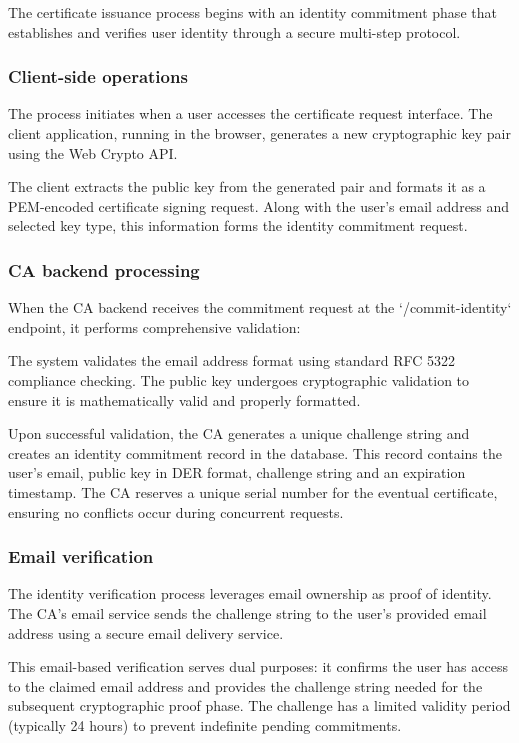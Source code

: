 The certificate issuance process begins with an identity commitment phase that 
establishes and verifies user identity through a secure multi-step protocol.

\subsubsection{Client-side operations}

The process initiates when a user accesses the certificate request interface. 
The client application, running in the browser, generates a new cryptographic 
key pair using the Web Crypto API. 

The client extracts the public key from the generated pair and formats it as 
a PEM-encoded certificate signing request. Along with the user's email address 
and selected key type, this information forms the identity commitment request.

\subsubsection{CA backend processing}

When the CA backend receives the commitment request at the `/commit-identity` 
endpoint, it performs comprehensive validation:

The system validates the email address format using standard RFC 5322 compliance 
checking. The public key undergoes cryptographic validation 
to ensure it is mathematically valid and properly formatted.

Upon successful validation, the CA generates a unique challenge string and creates 
an identity commitment record in the database. This record contains the user's 
email, public key in DER format, challenge string and an 
expiration timestamp. The CA reserves a unique serial number for the eventual 
certificate, ensuring no conflicts occur during concurrent requests.

\subsubsection{Email verification}

The identity verification process leverages email ownership as proof of identity. 
The CA's email service sends the challenge string to the user's provided email 
address using a secure email delivery service.

This email-based verification serves dual purposes: it confirms the user has 
access to the claimed email address and provides the challenge string needed 
for the subsequent cryptographic proof phase. The challenge has a limited 
validity period (typically 24 hours) to prevent indefinite pending commitments.

